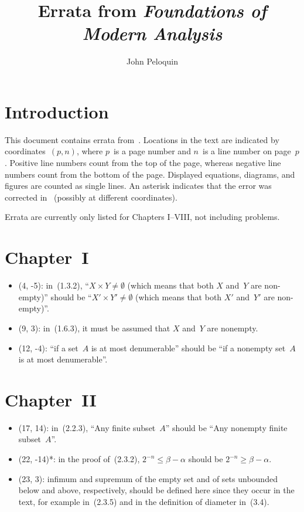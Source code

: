 \documentclass[letterpaper,12pt]{article}
\title{Errata from \textit{Foundations of Modern Analysis}}
\author{John Peloquin}
\date{}
\begin{document}
\maketitle
\section*{Introduction}
This document contains errata from~\cite{dieudonne8th}. Locations in the text are indicated by coordinates~\((p,n)\), where \(p\)~is a page number and \(n\)~is a line number on page~\(p\). Positive line numbers count from the top of the page, whereas negative line numbers count from the bottom of the page. Displayed equations, diagrams, and figures are counted as single lines. An asterisk indicates that the error was corrected in~\cite{dieudonne9th} (possibly at different coordinates).

Errata are currently only listed for Chapters I--VIII, not including problems.

\section*{Chapter~I}
\begin{itemize}
\item (4, -5): in~(1.3.2), ``\(X\times Y\ne\emptyset\) (which means that both \(X\) and~\(Y\) are non-empty)'' should be ``\(X'\times Y'\ne\emptyset\) (which means that both \(X'\) and~\(Y'\) are non-empty)''.
\item (9, 3): in~(1.6.3), it must be assumed that \(X\) and~\(Y\) are nonempty.
\item (12, -4): ``if a set~\(A\) is at most denumerable'' should be ``if a nonempty set~\(A\) is at most denumerable''.
\end{itemize}

\section*{Chapter~II}
\begin{itemize}
\item (17, 14): in~(2.2.3), ``Any finite subset~\(A\)'' should be ``Any nonempty finite subset~\(A\)''.
\item (22, -14)*: in the proof of~(2.3.2), \(2^{-n}\le\beta-\alpha\) should be \(2^{-n}\ge\beta-\alpha\).
\item (23, 3): infimum and supremum of the empty set and of sets unbounded below and above, respectively, should be defined here since they occur in the text, for example in~(2.3.5) and in the definition of diameter in~(3.4).
\end{itemize}
\end{document}
